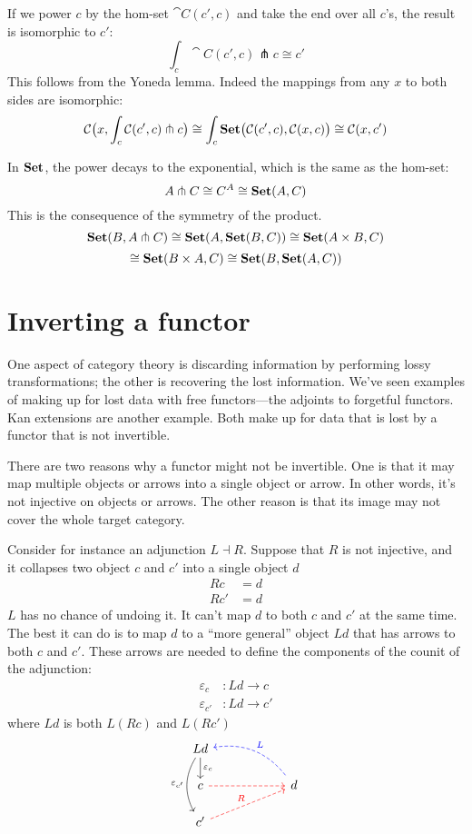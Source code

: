 \documentclass[DaoFP]{subfiles}
\begin{document}
If we power $c$ by the hom-set $\cat C(c', c)$ and take the end over all $c$'s, the result is isomorphic to $c'$:
\[ \int_c \cat C (c', c) \pitchfork c \cong c' \]
This follows from the Yoneda lemma. Indeed the mappings from any $x$ to both sides are isomorphic:
\[ \mathcal{C} \big(x, \int_c \mathcal{C} (c', c) \pitchfork c\big) \cong \int_c \mathbf{Set} \big( \mathcal{C}(c', c), \mathcal{C}(x, c)\big)  \cong \mathcal{C} (x, c') \]


In $\mathbf{Set}$, the power decays to the exponential, which is the same as the hom-set:
\[ A \pitchfork C \cong C^A \cong \mathbf{Set} (A, C) \]
This is the consequence of the symmetry of the product.
\[ \mathbf{Set}(B, A \pitchfork C) \cong \mathbf{Set} (A, \mathbf{Set}(B, C)) \cong \mathbf{Set} (A \times B, C) \]
\[ \cong \mathbf{Set} (B \times A, C) \cong \mathbf{Set} (B, \mathbf{Set} (A, C))\]

\section{Inverting a functor}

One aspect of category theory is discarding information by performing lossy transformations; the other is recovering the lost information. We've seen examples of making up for lost data with free functors---the adjoints to forgetful functors. Kan extensions are another example. Both make up for data that is lost by a functor that is not invertible.

There are two reasons why a functor might not be invertible. One is that it may map multiple objects or arrows into a single object or arrow. In other words, it's not injective on objects or arrows. The other reason is that its image may not cover the whole target category. 

Consider for instance an adjunction $L \dashv R$. Suppose that $R$ is not injective, and it collapses two object $c$ and $c'$ into a single object $d$
\begin{align*}
R c &= d \\
R c' &= d
\end{align*}
$L$ has no chance of undoing it. It can't map $d$ to both $c$ and $c'$ at the same time. The best it can do is to map $d$ to a ``more general'' object $L d$ that has arrows to both $c$ and $c'$. These arrows are needed to define the components of the counit of the adjunction:
\begin{align*}
\varepsilon_c &\colon L d \to c
\\
\varepsilon_{c'} &\colon L d \to c'
\end{align*}
where $L d$ is both $L (R c)$ and $L (R c')$
\[
 \begin{tikzcd} [row sep=0.5cm, column sep=1cm]
 L d
 \arrow[d, "\varepsilon_c"]
 \arrow[dd, bend right, "\varepsilon_{c'}"']
 \\
 c
 \arrow[rr, red, dashed, ""]
 && d
 \arrow[ull, blue, bend right, dashed, "L"']
 \\
 c'
 \arrow[urr, red, dashed, "R"]
  \end{tikzcd}
\]
\end{document}
